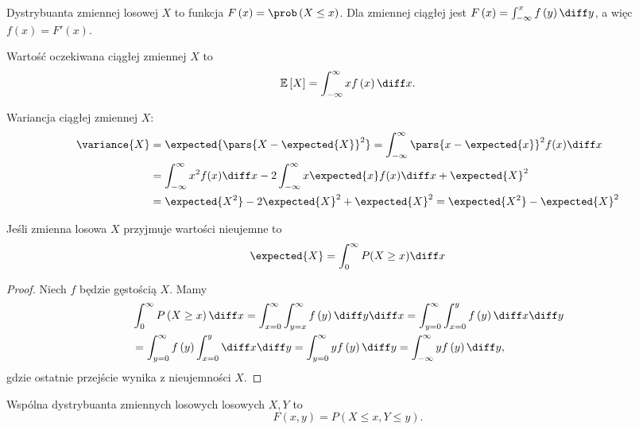 \begin{definition}
	Dystrybuanta zmiennej losowej \(X\) to funkcja \(F\left( x  \right) = \prob\left( X\le x  \right) \). Dla zmiennej ciągłej jest \(F\left( x  \right) = \int_{-\infty}^{x} f\left( y  \right) \diff y \), a więc \(f\left( x  \right) = F'\left( x  \right) \).
\end{definition}

\begin{definition}
	Wartość oczekiwana ciągłej zmiennej \(X\) to
	\[ \mathbb{E}\left[  X \right] = \int_{-\infty}^{\infty} x f\left( x  \right) \diff x  .\]
\end{definition}

\begin{definition}
	Wariancja ciągłej zmiennej \(X\):
	\begin{align*}
		\variance{X} & = \expected{\pars{X - \expected{X}}^2} = \int_{-\infty}^{\infty} \pars{x - \expected{x}}^2 f(x) \diff x        \\
		             & = \int_{-\infty}^{\infty}x^2 f(x) \diff x - 2\int_{-\infty}^{\infty} x\expected{x}f(x)\diff x + \expected{X}^2 \\
		             & = \expected{X^2} - 2 \expected{X}^2 + \expected{X}^2 = \expected{X^2} - \expected{X}^2
	\end{align*}
\end{definition}

\begin{lemma}[Lemat 8.1 P\&C]
	\label{continuous-positive-random-variable-lemma}
	Jeśli zmienna losowa \(X\) przyjmuje wartości nieujemne to
	\[
		\expected{X} = \int_0^\infty P(X \geq x) \diff x
	\]
\end{lemma}
\begin{proof}
	Niech \(f\) będzie gęstością \(X\). Mamy
	\begin{align*}
		 & \int_{0}^{\infty} P\left( X\ge x  \right) \diff x = \int_{x=0}^{\infty}  \int_{y=x}^{\infty} f\left( y  \right) \diff y \diff x = \int_{y=0}^{\infty} \int_{x=0}^{y} f\left( y  \right) \diff x \diff y \\
		 & = \int_{y=0}^{\infty} f\left( y  \right) \int_{x=0}^{y} \diff x \diff y = \int_{y=0}^{\infty} y f\left( y  \right) \diff y = \int_{-\infty}^{\infty} y f\left( y  \right) \diff y,
	\end{align*}
	gdzie ostatnie przejście wynika z nieujemności \(X\).
\end{proof}

\begin{definition}
	Wspólna dystrybuanta zmiennych losowych losowych \(X,Y\) to
	\[ F\left( x,y \right) = P\left( X\le x, Y\le y  \right)  .\]
\end{definition}

